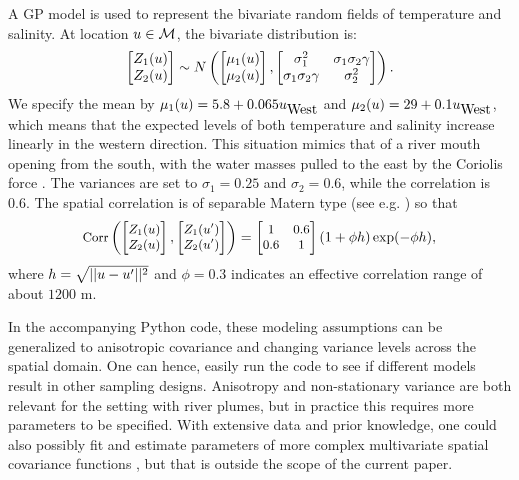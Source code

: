 \documentclass[aoas]{imsart}
\begin{document}
A GP model is used to represent the bivariate random fields of
temperature and salinity. At location $u \in \mathcal{M}$, the
bivariate distribution is:
\begin{equation}\label{gp_bar}
\begin{bmatrix}Z_1(\x) \\
Z_2(\x) \end{bmatrix}
\sim N \left( 
\begin{bmatrix} \mu_{1}(\x)\\
\mu_{2}(\x)
\end{bmatrix},\begin{bmatrix}
\sigma_{1}^2 & \sigma_{1} \sigma_2 \gamma \\
\sigma_{1} \sigma_2 \gamma  & \sigma_{2}^2 
\end{bmatrix}
\right).
\end{equation}
We specify the mean by $\mu_{1}(u)=5.8 + 0.065 u_{\mbox{West}}$ and
$\mu_{2}(u)=29 + 0.1 u_{\mbox{West}}$, which means that the expected
levels of both temperature and salinity increase linearly in the
western direction.  This situation mimics that of a river mouth
opening from the south, with the water masses pulled to the east by
the Coriolis force .  The variances are set to $\sigma_1=0.25$ and
$\sigma_2=0.6$, while the correlation is $0.6$.  The spatial
correlation is of separable Matern type (see e.g. \cite{Cressie:11})
so that
\begin{equation}\label{v}
\small
\mbox{Corr} 
\left(
\begin{bmatrix}
    Z_1(\x) \\
    Z_2(\x) 
    \end{bmatrix},
    \begin{bmatrix}
    Z_1(\x') \\
    Z_2(\x') 
    \end{bmatrix}
    \right)
    = \begin{bmatrix}
1 & 0.6  \\
0.6  & 1
\end{bmatrix}(1+\phi h)\exp (-\phi h),
\end{equation}
where $h=\sqrt{||u-u'||^2}$ and $\phi=0.3$ indicates an effective
correlation range of about $1200$ m.

In the accompanying Python code, these modeling assumptions can be
generalized to anisotropic covariance and changing variance levels
across the spatial domain. One can hence, easily run the code to see
if different models result in other sampling designs. Anisotropy and
non-stationary variance are both relevant for the setting with river
plumes, but in practice this requires more parameters to be
specified. With extensive data and prior knowledge, one could also
possibly fit and estimate parameters of more complex multivariate
spatial covariance functions
\citep{gneiting2010matern,genton2015cross}, but that is outside the
scope of the current paper.
\end{document}
